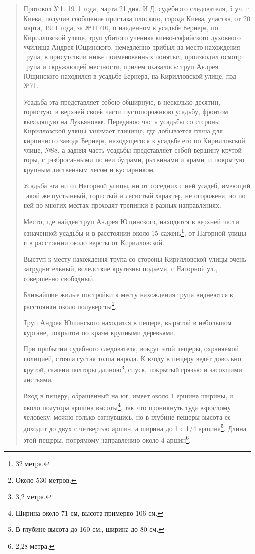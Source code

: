 \begin{quotation} 
Протокол №1. 1911 года, марта 21 дня. И.Д. судебного следователя, 5 уч. г. Киева, получив сообщение пристава плоскаго, города Киева, участка, от 20 марта, 1911 года, за №11710, о найденном в усадьбе Бернера, по Кирилловской улице, труп убитого ученика киево-софи\-йского духовного училища Андрея Ющинского, немедленно прибыл на место нахождения трупа, в присутствии ниже поименованных понятых, производил осмотр трупа и окружающей местности, причем оказалось: труп Андрея Ющинского  находился в усадьбе Бернера, на Кирилловской улице, под №71. 

Усадьба эта представляет собою обширную, в неск\-олько десятин, гористую, в верхней своей части пустопорожнюю усадьбу, фронтом выходящую на Лукьяновке. Переднюю часть усадьбы со стороны Кирилловской улицы занимает глинище, где добывается глина для кирпичного завода Бернера, находящегося в усадьбе его по Кирилловской улице, №88, а задняя часть усадьбы представляет собой вершину крутой горы, с разбросанными по ней буграми, рытвинами и ярами, и покрытую крупным лиственным лесом и кустарником.

Усадьба эта ни от Нагорной улицы, ни от соседних с ней усадеб, имеющий такой же пустынный, гористый и лесистый характер, не огорожена, но по ней во многих местах проходят тропинки в разных направлениях.

Место, где найден труп Андрея Ющинского, находится в верхней части означенной усадьбы и в расстоянии около 15 сажень\footnote{32 метра.}, от Нагорной улицы и в расстоянии около версты от Кирилловской.

Выступ к месту нахождения трупа со стороны Кирилловской улицы очень затруднительный, вследствие крутизны подъема, с Нагорной ул., совершенно свободный.

Ближайшие жилые постройки к месту нахождения трупа виднеются в расстоянии около полуверсты\footnote{Около 530 метров.}.

Труп Андрея Ющинского находится в пещере, вырытой в небольшом кургане, покрытом по краям крупными деревьями. 

При прибытии судебного следователя, вокруг этой пещеры, охраняемой полицией, стояла густая толпа народа. К входу в пещеру ведет довольно крутой, сажени полторы длиною\footnote{3,2 метра.}, спуск, покрытый грязью и засохшими листьями.

Вход в пещеру, обращенный на юг, имеет около 1 аршина ширины, и около полутора аршина высоты\footnote{Ширина около 71 см, высота примерно 106 см.}, так что проникнуть туда взрослому человеку, можно только согнувшись, но в глубине пещеры высота ее доходит до двух с четвертью аршин, а ширина до 1 с 1/4 аршина\footnote{В глубине высота до 160 см., ширина до 80 см.}. Длина этой пещеры, попрямому направлению около 4 аршин\footnote{2,28 метра.}.


\end{quotation}
